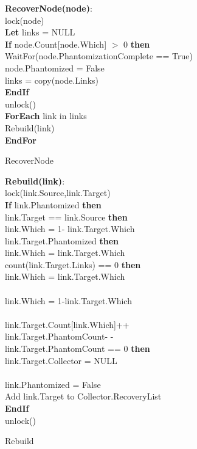 \begin{algorithm}[ht]
{\small
{\bf RecoverNode(node)}:\\
{\Indp
 {lock(node)}\\
{\bf Let} links = NULL\\
{\bf If} node.Count[node.Which] $>$ 0 {\bf then}\\
\quad WaitFor(node.PhantomizationComplete == True)\\
\quad node.Phantomized = False\\
\quad links = copy(node.Links)\\
{\bf EndIf}\\
 {unlock()}\\
{\bf ForEach} link in links \\
\quad Rebuild(link)\\
{\bf EndFor}\\
}
}
\caption{RecoverNode}
\label{algorithm:recover}
\end{algorithm}
\setlength{\textfloatsep}{0pt}

\begin{algorithm}[ht]
{\small
{\bf Rebuild(link)}:\\
{\Indp
 {lock(link.Source,link.Target)}\\
{\bf If} link.Phantomized {\bf then}\\
 link.Target == link.Source {\bf then}\\
\quad \quad link.Which = 1- link.Target.Which\\
 link.Target.Phantomized {\bf then} \\
\quad \quad link.Which = link.Target.Which\\
 count(link.Target.Links) == 0 {\bf then}\\
\quad \quad link.Which = link.Target.Which\\
\\
\quad \quad link.Which = 1-link.Target.Which\\
\\
\quad link.Target.Count[link.Which]++\\
\quad link.Target.PhantomCount- -\\
 link.Target.PhantomCount == 0 {\bf then}\\
\quad \quad link.Target.Collector = NULL\\
\\
\quad link.Phantomized = False \\
\quad Add link.Target to Collector.RecoveryList\\
{\bf EndIf}\\
 {unlock()}\\
}
}
\caption{Rebuild}
\label{single:algorithm:rebuild}
\end{algorithm}
\setlength{\textfloatsep}{0pt}

